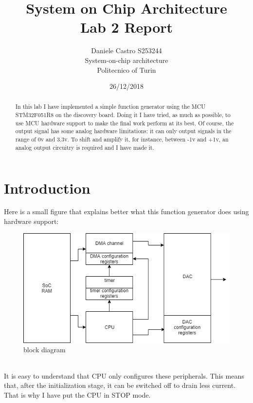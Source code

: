 \documentclass[peerreview]{IEEEtran}
\begin{document}
\title{System on Chip Architecture \\ Lab 2 Report}


\author{Daniele Castro S253244\\
System-on-chip architecture\\
Politecnico of Turin\\
}
\date{26/12/2018}

\maketitle
\tableofcontents
\listoffigures

\IEEEpeerreviewmaketitle
\begin{abstract}
In this lab I have implemented a simple function generator using the MCU STM32F051R8 on the discovery board. Doing it I have tried, as much as possible, to use MCU hardware support to make the final work perform at its best. Of course, the output signal has some analog hardware limitations: it can only output signals in the range of 0v and 3.3v. To shift and amplify it, for instance, between -1v and +1v, an analog output circuitry is required and I have made it.
\end{abstract}
\section{Introduction}
Here is a small figure that  explains better what this function generator does using hardware support:
\begin{figure}[!ht]
\centering
\includegraphics[width=0.8\columnwidth]{DAC} 
\caption{block diagram}
\label{fig_sim}
\end{figure}
\\It is easy to understand that CPU only configures these peripherals. This means that, after the initialization stage,  it can be switched off to drain less current. That is why I have put the CPU in STOP mode.
\end{document}
